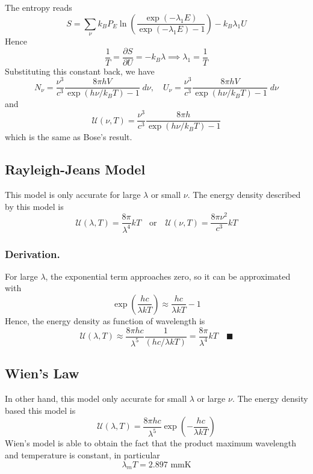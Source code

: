 \documentclass[../../../Main.tex]{subfiles}
\begin{document}
The entropy reads
\begin{equation*}
    S=\sum_\nu k_B P_E \ln\left(\frac{\exp(-\lambda_1E)}{\exp(-\lambda_1E)-1}\right)-k_B\lambda_1 U
\end{equation*}
Hence 
\begin{equation*}
    \frac{1}{T}=\frac{\partial S}{\partial U}=-k_B\lambda\implies \lambda_1=\frac{1}{T}
\end{equation*}
Substituting this constant back, we have
\begin{equation*}
    N_\nu=\frac{\nu^3}{c^3}\frac{8\pi h V}{\exp(h\nu/k_BT)-1}\;d\nu,\quad     U_\nu=\frac{\nu^3}{c^3}\frac{8\pi h V}{\exp(h\nu/k_BT)-1}\;d\nu 
\end{equation*}
and
\begin{equation*}
    \mathcal{U}(\nu,T) =\frac{\nu^3}{c^3}\frac{8\pi h}{\exp(h\nu/k_BT)-1}
\end{equation*}
which is the same as Bose's result.

\subsection{Rayleigh-Jeans Model}
This model is only accurate for large $\lambda$ or small $\nu$. The energy density described by this model is 
\begin{equation*}
    \mathcal{U}(\lambda,T)=\frac{8\pi}{\lambda^4}kT\quad\text{or}\quad\mathcal{U}(\nu,T)=\frac{8\pi\nu^2}{c^3}kT
\end{equation*}
\subsubsection{Derivation.} For large $\lambda$, the exponential term approaches zero, so it can be approximated with 
\begin{equation*}
    \exp\left(\frac{hc}{\lambda kT}\right)\approx\frac{hc}{\lambda kT}-1
\end{equation*}
Hence, the energy density as function of wavelength is 
\begin{equation*}
    \mathcal{U}(\lambda,T)\approx\frac{8\pi hc}{\lambda^5}\frac{1}{(hc/\lambda kT)}=\frac{8\pi}{\lambda^4}kT\quad\blacksquare
\end{equation*}

\subsection{Wien's Law}
In other hand, this model only accurate for small $\lambda$ or large $\nu$. The energy density based this model is 
\begin{equation*}
    \mathcal{U}(\lambda,T)=\frac{8\pi hc}{\lambda^5}\exp\left(-\frac{hc}{\lambda kT}\right)
\end{equation*}
Wien's model is able to obtain the fact that the product maximum wavelength and temperature is constant, in particular
\begin{equation*}
    \lambda_m T=2.897 \text{ mmK}
\end{equation*}
\end{document}
